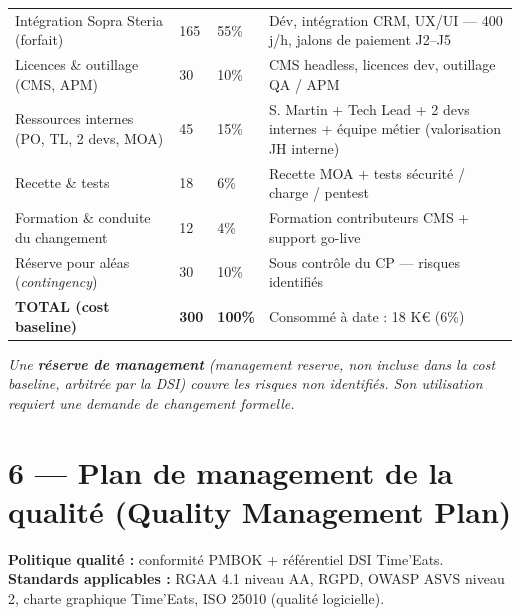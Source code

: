 \documentclass[11pt,a4paper,oneside]{report}
\begin{document}
\renewcommand{\arraystretch}{1.3}
\begin{tabularx}{\textwidth}{L{5cm} C{2.2cm} C{2cm} Y}
\toprule
{} &  &  &  \\
\midrule
Intégration Sopra Steria (forfait)   & 165 & 55\% & Dév, intégration CRM, UX/UI — 400 j/h, jalons de paiement J2–J5 \\
Licences \& outillage (CMS, APM)     &  30 & 10\% & CMS headless, licences dev, outillage QA / APM \\
Ressources internes (PO, TL, 2 devs, MOA) &  45 & 15\% & S. Martin + Tech Lead + 2 devs internes + équipe métier (valorisation JH interne) \\
Recette \& tests                     &  18 &  6\% & Recette MOA + tests sécurité / charge / pentest \\
Formation \& conduite du changement  &  12 &  4\% & Formation contributeurs CMS + support go-live \\
Réserve pour aléas (\textit{contingency}) &  30 & 10\% & Sous contrôle du CP — risques identifiés \\
\midrule
{}\textbf{TOTAL (cost baseline)} & \textbf{300} & \textbf{100\%} & Consommé à date : 18 K€ (6\%) \\
\bottomrule
\end{tabularx}

\textit{Une \textbf{réserve de management} (\textit{management reserve}, non incluse dans
la cost baseline, arbitrée par la DSI) couvre les risques non identifiés. Son utilisation
requiert une demande de changement formelle.}

\section*{6 — Plan de management de la qualité (Quality Management Plan)}

\textbf{Politique qualité :} conformité PMBOK + référentiel DSI Time'Eats. \textbf{Standards
applicables :} RGAA 4.1 niveau AA, RGPD, OWASP ASVS niveau 2, charte graphique Time'Eats,
ISO 25010 (qualité logicielle).
\end{document}
